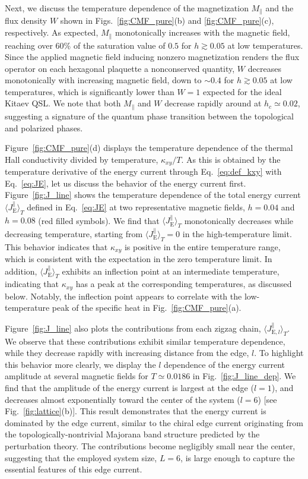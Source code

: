 \documentclass[twocolumn,superscriptaddress,showpacs, longbibliography, aps, prx]{revtex4-2}
\begin{document}
Next, we discuss the temperature dependence of the magnetization $M_\parallel$ and the flux density $W$ shown in Figs.~\ref{fig:CMF_pure}(b) and \ref{fig:CMF_pure}(c), respectively. 
As expected, $M_\parallel$ monotonically increases with the magnetic field, reaching over 60\% of the saturation value of $0.5$ for $h\gtrsim 0.05$ at low temperatures. 
Since the applied magnetic field inducing nonzero magnetization renders the flux operator on each hexagonal plaquette a nonconserved quantity, $W$ decreases monotonically with increasing magnetic field, down to $\sim 0.4$ for $h\gtrsim 0.05$ at low temperatures, which is significantly lower than $W=1$ expected for the ideal Kitaev QSL.
We note that both $M_{\parallel}$ and $W$ decrease rapidly around at $h_c \simeq 0.02$, suggesting a signature of the quantum phase transition between the topological and polarized phases. 

Figure~\ref{fig:CMF_pure}(d) displays the temperature dependence of the thermal Hall conductivity divided by temperature, $\kappa_{xy}/T$. 
As this is obtained by the temperature derivative of the energy current through Eq.~\eqref{eq:def_kxy} with Eq.~\eqref{eq:JE}, let us discuss the behavior of the energy current first. 
Figure~\ref{fig:J_line} shows the temperature dependence of the total energy current $\langle J_{\mathrm{E}}^\parallel \rangle_T$ defined in Eq.~\eqref{eq:JE} at two representative magnetic fields, $h=0.04$ and $h=0.08$ (red filled symbols). 
We find that $\langle J_{\mathrm{E}}^\parallel \rangle_T$ monotonically decreases while decreasing temperature, starting from $\langle J_{\mathrm{E}}^{\parallel} \rangle_T =0$ in the high-temperature limit. This behavior indicates that $\kappa_{xy}$ is positive in the entire temperature range, which is consistent with the expectation in the zero temperature limit. 
In addition, $\langle J_{\mathrm{E}}^\parallel \rangle_T$ exhibits an inflection point at an intermediate temperature, indicating that $\kappa_{xy}$ has a peak at the corresponding temperatures, as discussed below. 
Notably, the inflection point appears to correlate with the low-temperature peak of the specific heat in Fig.~\ref{fig:CMF_pure}(a). 

Figure~\ref{fig:J_line} also plots the contributions from each zigzag chain, $\langle J_{\mathrm{E},l}^\parallel \rangle_T$. 
We observe that these contributions exhibit similar temperature dependence, while they decrease rapidly with increasing distance from the edge, $l$. 
To highlight this behavior more clearly, we display the $l$ dependence of the energy current amplitude at several magnetic fields for $T\simeq 0.0186$ in Fig.~\ref{fig:J_line_dep}. 
We find that the amplitude of the energy current is largest at the edge ($l=1$), and decreases almost exponentially toward the center of the system ($l=6$) [see Fig.~\ref{fig:lattice}(b)]. 
This result demonstrates that the energy current is dominated by the edge current, similar to the chiral edge current originating from the topologically-nontrivial Majorana band structure predicted by the perturbation theory.
The contributions become negligibly small near the center, suggesting that the employed system size, $L=6$, is large enough to capture the essential features of this edge current. 
\end{document}
